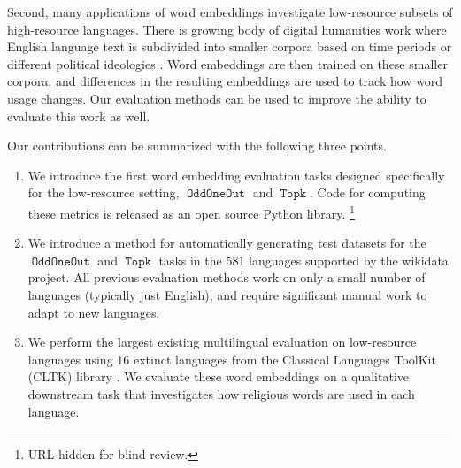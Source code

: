 \documentclass[11pt,a4paper]{article}
\DeclareMathOperator{\OddOneOut}{\texttt{OddOneOut}}
\DeclareMathOperator{\topk}{\texttt{Topk}}
\begin{document}
Second, many applications of word embeddings investigate low-resource subsets of high-resource languages.
There is growing body of digital humanities work where English language text is subdivided into smaller corpora based on time periods \cite[e.g.][]{kulkarni2015statistically,hamilton2016diachronic,hamilton2016cultural,dubossarsky2017outta,szymanski2017temporal,chen2017understanding,liang2018dynamic,tang2018state,kutuzov2018diachronic,kozlowski2019geometry}
or different political ideologies \citet{azarbonyad2017words}.
Word embeddings are then trained on these smaller corpora,
and differences in the resulting embeddings are used to track how word usage changes.
Our evaluation methods can be used to improve the ability to evaluate this work as well.

Our contributions can be summarized with the following three points.

\label{sec:contributions}
\begin{enumerate}
    \item 
    We introduce the first word embedding evaluation tasks designed specifically for the low-resource setting, $\OddOneOut$ and $\topk$.
    Code for computing these metrics is released as an open source Python library.%
    \footnote{
        URL hidden for blind review.
    }
    \item 
    We introduce a method for automatically generating test datasets for the $\OddOneOut$ and $\topk$ tasks in the 581 languages supported by the wikidata project.
    All previous evaluation methods work on only a small number of languages (typically just English),
    and require significant manual work to adapt to new languages.
	\item 
    We perform the largest existing multilingual evaluation on low-resource languages using 16 extinct languages from the Classical Languages ToolKit (CLTK) library \citep{johnson2014}.
    We evaluate these word embeddings on a qualitative downstream task that investigates how religious words are used in each language.
\end{enumerate}
\end{document}

